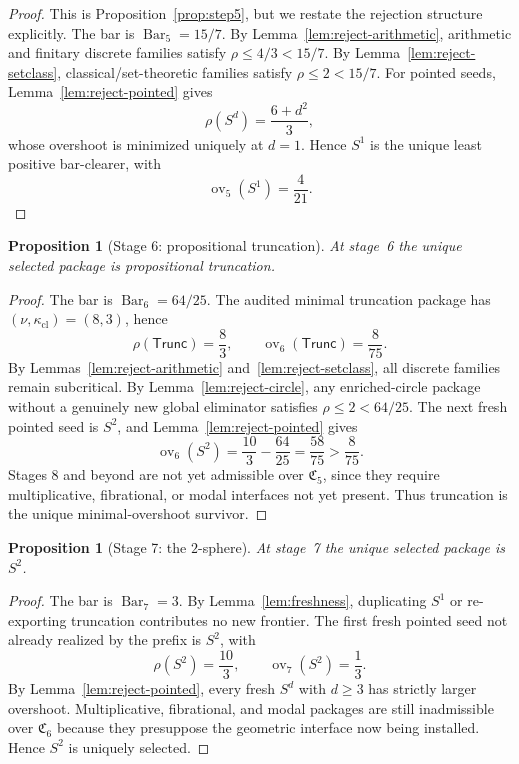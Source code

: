 \documentclass{lmcs}
\theoremstyle{plain}
\newtheorem{prop}[thm]{Proposition}
\theoremstyle{definition}
\theoremstyle{remark}
\newcommand{\Core}{\ensuremath{\mathfrak{C}}}
\newcommand{\SelBar}{\ensuremath{\operatorname{Bar}}}
\newcommand{\ov}{\ensuremath{\operatorname{ov}}}
\begin{document}
\begin{proof}
This is Proposition~\ref{prop:step5}, but we restate the rejection structure explicitly.
The bar is $\SelBar_5=15/7$.
By Lemma~\ref{lem:reject-arithmetic}, arithmetic and finitary discrete families satisfy $\rho\le 4/3<15/7$.
By Lemma~\ref{lem:reject-setclass}, classical/set-theoretic families satisfy $\rho\le 2<15/7$.
For pointed seeds, Lemma~\ref{lem:reject-pointed} gives
\[
  \rho(S^d)=\frac{6+d^2}{3},
\]
whose overshoot is minimized uniquely at $d=1$.
Hence $S^1$ is the unique least positive bar-clearer, with
\[
  \ov_5(S^1)=\frac{4}{21}.
\]
\end{proof}

\begin{prop}[Stage 6: propositional truncation]
\label{prop:appendix-stage6}
At stage~6 the unique selected package is propositional truncation.
\end{prop}

\begin{proof}
The bar is $\SelBar_6=64/25$.
The audited minimal truncation package has $(\nu,\kappa_{\mathrm{cl}})=(8,3)$, hence
\[
  \rho(\mathsf{Trunc})=\frac83,\qquad
  \ov_6(\mathsf{Trunc})=\frac{8}{75}.
\]
By Lemmas~\ref{lem:reject-arithmetic} and~\ref{lem:reject-setclass}, all discrete families remain subcritical.
By Lemma~\ref{lem:reject-circle}, any enriched-circle package without a genuinely new global eliminator satisfies $\rho\le 2<64/25$.
The next fresh pointed seed is $S^2$, and Lemma~\ref{lem:reject-pointed} gives
\[
  \ov_6(S^2)=\frac{10}{3}-\frac{64}{25}=\frac{58}{75}>\frac{8}{75}.
\]
Stages 8 and beyond are not yet admissible over $\Core_5$, since they require multiplicative, fibrational, or modal interfaces not yet present.
Thus truncation is the unique minimal-overshoot survivor.
\end{proof}

\begin{prop}[Stage 7: the $2$-sphere]
\label{prop:appendix-stage7}
At stage~7 the unique selected package is $S^2$.
\end{prop}

\begin{proof}
The bar is $\SelBar_7=3$.
By Lemma~\ref{lem:freshness}, duplicating $S^1$ or re-exporting truncation contributes no new frontier.
The first fresh pointed seed not already realized by the prefix is $S^2$, with
\[
  \rho(S^2)=\frac{10}{3},\qquad \ov_7(S^2)=\frac13.
\]
By Lemma~\ref{lem:reject-pointed}, every fresh $S^d$ with $d\ge 3$ has strictly larger overshoot.
Multiplicative, fibrational, and modal packages are still inadmissible over $\Core_6$ because they presuppose the geometric interface now being installed.
Hence $S^2$ is uniquely selected.
\end{proof}
\end{document}
